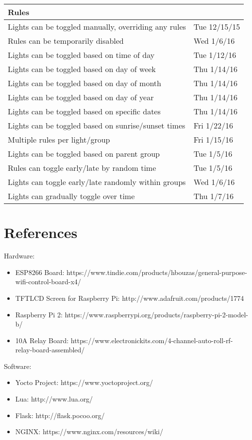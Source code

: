 \documentclass[oneside,openright]{book}
\begin{document}
\begin{tabular}{ | l | l | }
   \textbf{Rules} & \\ \hline
   
   Lights can be toggled manually, overriding any rules & Tue 12/15/15 \\ \hline
   Rules can be temporarily disabled & Wed 1/6/16 \\ \hline
   Lights can be toggled based on time of day & Tue 1/12/16 \\ \hline
   Lights can be toggled based on day of week & Thu 1/14/16 \\ \hline
   Lights can be toggled based on day of month & Thu 1/14/16 \\ \hline
   Lights can be toggled based on day of year & Thu 1/14/16 \\ \hline
   Lights can be toggled based on specific dates & Thu 1/14/16 \\ \hline
   Lights can be toggled based on sunrise/sunset times & Fri 1/22/16 \\ \hline
   Multiple rules per light/group & Fri 1/15/16 \\ \hline
   Lights can be toggled based on parent group & Tue 1/5/16 \\ \hline
   Rules can toggle early/late by random time & Tue 1/5/16 \\ \hline
   Lights can toggle early/late randomly within groups & Wed 1/6/16 \\ \hline
   Lights can gradually toggle over time & Thu 1/7/16 \\ \hline
\end{tabular}

\section{References}

Hardware:
\begin{itemize}
    \item ESP8266 Board: https://www.tindie.com/products/hbouzas/general-purpose-wifi-control-board-x4/
    \item TFTLCD Screen for Raspberry Pi: http://www.adafruit.com/products/1774
    \item Raspberry Pi 2: https://www.raspberrypi.org/products/raspberry-pi-2-model-b/
    \item 10A Relay Board: https://www.electronickits.com/4-channel-auto-roll-rf-relay-board-assembled/
\end{itemize}
Software:
\begin{itemize}
    \item Yocto Project: https://www.yoctoproject.org/
    \item Lua: http://www.lua.org/
    \item Flask: http://flask.pocoo.org/
    \item NGINX: https://www.nginx.com/resources/wiki/
\end{itemize}
\end{document}
